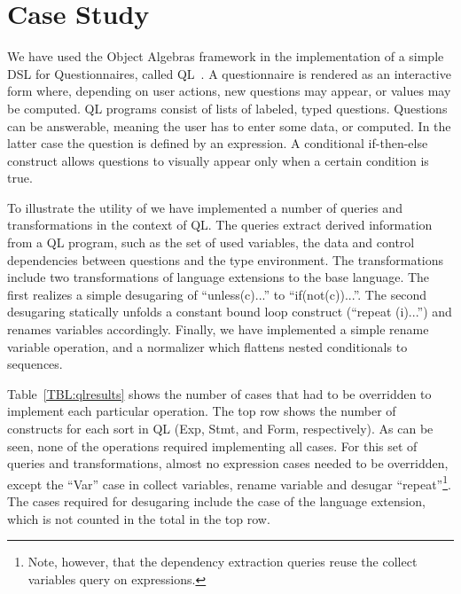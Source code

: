 \section{Case Study}

We have used the Object Algebras framework in the implementation of a simple DSL for Questionnaires, called QL~\cite{GPCE}.
A questionnaire is rendered as an interactive form where, depending on user actions, new questions may appear, or values may be computed. 
QL programs consist of lists of labeled, typed questions.
Questions can be answerable, meaning the user has to enter some data, or computed.
In the latter case the question is defined by an expression.
A conditional if-then-else construct allows questions to visually appear only when a certain condition is true. 

To illustrate the utility of \name we have implemented a number of queries and transformations in the context of QL. The queries extract derived information from a QL program, such as the set of used variables, the data and control dependencies between questions and the type environment.
The transformations include two transformations of language extensions to the base language.
The first realizes a simple desugaring of ``unless(c){...}'' to ``if(not(c)){...}''.
The second desugaring statically unfolds a constant bound loop construct (``repeat (i){...}'') and renames variables accordingly.
Finally, we have implemented a simple rename variable operation, and a normalizer which flattens nested conditionals to sequences.  

Table~\ref{TBL:qlresults} shows the number of cases that had to be overridden to implement each particular operation. The top row shows the number of  constructs for each sort in QL (Exp, Stmt, and Form, respectively).
As can be seen, none of the operations required implementing all cases.
For this set of queries and transformations, almost no expression cases needed to be overridden, except the ``Var'' case in collect variables, rename variable and desugar ``repeat''\footnote{Note, however, that the dependency extraction queries reuse the collect variables query on expressions.}.
The cases required for desugaring include the case of the language extension, which is not counted in the total in the top row. 

